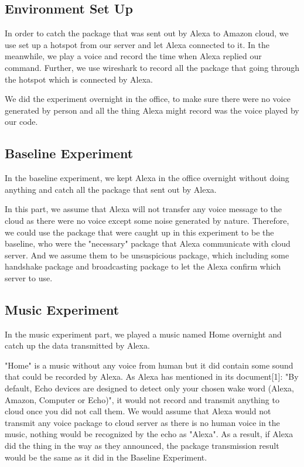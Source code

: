 \subsection{Environment Set Up}

In order to catch the package that was sent out by Alexa to Amazon cloud, we use set up a hotspot from our server and let Alexa connected to it. In the meanwhile, we play a voice and record the time when Alexa replied our command. Further, we use wireshark to record all the package that going through the hotspot which is connected by Alexa. 

We did the experiment overnight in the office, to make sure there were no voice generated by person and all the thing Alexa might record was the voice played by our code.

\subsection{Baseline Experiment}

In the baseline experiment, we kept Alexa in the office overnight without doing anything and catch all the package that sent out by Alexa.

In this part, we assume that Alexa will not transfer any voice message to the cloud as there were no voice except some noise generated by nature. Therefore, we could use the package that were caught up in this experiment to be the baseline, who were the "necessary" package that Alexa communicate with cloud server. And we assume them to be unsuspicious package, which including some handshake package and broadcasting package to let the Alexa confirm which server to use.

\subsection{Music Experiment}

In the music experiment part, we played a music named Home overnight and catch up the data transmitted by Alexa.

"Home" is a music without any voice from human but it did contain some sound that could be recorded by Alexa. As Alexa has mentioned in its document[1]: "By default, Echo devices are designed to detect only your chosen wake word (Alexa, Amazon, Computer or Echo)", it would not record and transmit anything to cloud once you did not call them. We would assume that Alexa would not transmit any voice package to cloud server as there is no human voice in the music, nothing would be recognized by the echo as "Alexa". As a result, if Alexa did the thing in the way as they announced, the package transmission result would be the same as it did in the Baseline Experiment.


